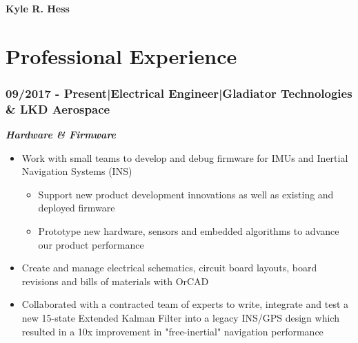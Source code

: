 \documentclass[]{article}
\begin{document}
\begin{singlespace}
\noindent\textbf{\huge{Kyle R. Hess}}
\hfill \break
\noindent\makebox[\linewidth]{\rule{\textwidth}{1pt}}
    \vspace{-8mm}

\section*{Professional Experience}

\subsubsection*{09/2017 - Present\hspace{3 mm}|\hspace{3 mm}Electrical Engineer\hspace{3 mm}|\hspace{3 mm}Gladiator Technologies \& LKD Aerospace}
\textbf{\emph{Hardware \& Firmware}}
\vspace{-2mm}
\begin{itemize}
    \setlength\itemsep{0em}
    \item Work with small teams to develop and debug firmware for IMUs and Inertial Navigation Systems (INS)
    \vspace{-2mm}
    \begin{itemize}
        \setlength\itemsep{0em}
        \item Support new product development innovations as well as existing and deployed firmware
        \item Prototype new hardware, sensors and embedded algorithms to advance our product performance
    \end{itemize}
    \vspace{-1mm}
    \item Create and manage electrical schematics, circuit board layouts, board revisions and bills of materials with OrCAD
    \item Collaborated with a contracted team of experts to write, integrate and test a new 15-state Extended Kalman Filter into a legacy INS/GPS design which resulted in a 10x improvement in "free-inertial" navigation performance
\end{itemize}


\end{singlespace}
\end{document}

